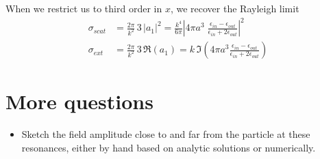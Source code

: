 When we restrict us to third order in $x$, we recover the Rayleigh limit
\begin{eqnarray*}
\sigma_{scat} & = \frac{2 \pi }{k^2} \, 3 \, \left| a_1 \right|^2 
 = \frac{k^4}{6 \pi} \left| 4 \pi a^3  \; \frac{\epsilon_{in} - \epsilon_{out}}{\epsilon_{in} + 2 \epsilon_{out}} \right|^2 \\
\sigma_{ext} & = \frac{2 \pi }{k^2} \, 3 \, \Re \left( a_1 \right) 
= k \, \Im \left( 4 \pi a^3 \frac{\epsilon_{in} - \epsilon_{out}}{\epsilon_{in} + 2 \epsilon_{out}}  \right)
\end{eqnarray*}


\section{More questions}

\begin{itemize}
\item Sketch the field amplitude close to and far from the particle at these resonances, either by hand based on analytic solutions or numerically.
\end{itemize}


\printbibliography[segment=\therefsegment,heading=subbibliography]
